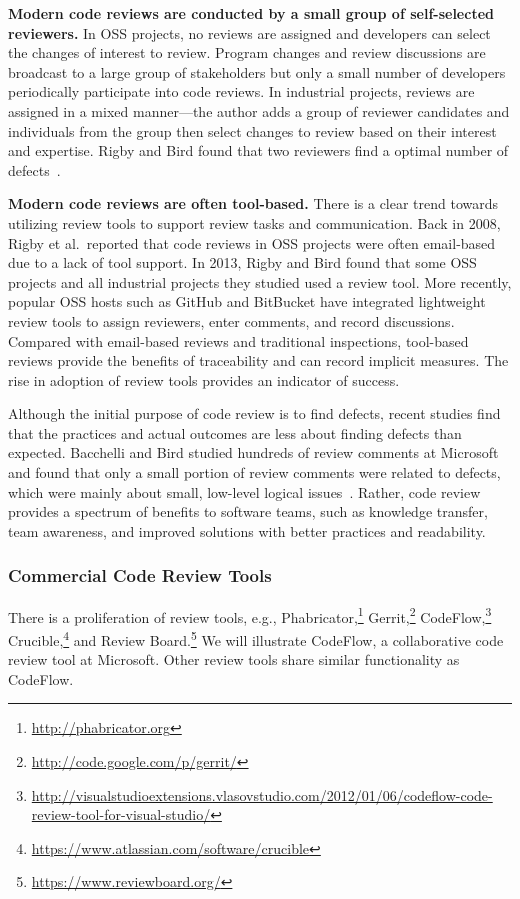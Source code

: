 \documentclass[runningheads,a4paper]{llncs}
\begin{document}
{\bf Modern code reviews are conducted by a small group of self-selected reviewers.} 
In OSS projects, no reviews are assigned and developers can select the changes of interest to review. Program changes and review discussions are broadcast to a large group of stakeholders but only a small number of developers periodically participate into code reviews. In industrial projects, reviews are assigned in a mixed manner---the author adds a group of reviewer candidates and individuals from the group then select changes to review based on their interest and expertise. Rigby and Bird found that two reviewers find a optimal number of defects~\cite{rigby2013convergent}.

{\bf Modern code reviews are often tool-based.} There is a clear trend towards utilizing review tools to support review tasks and communication. Back in 2008, Rigby et al.~reported that code reviews in OSS projects were often email-based due to a lack of tool support. In 2013, Rigby and Bird found that some OSS projects and all industrial projects they studied used a review tool. More recently, popular OSS hosts such as GitHub and BitBucket have integrated lightweight review tools to assign reviewers, enter comments, and record discussions. Compared with email-based reviews and traditional inspections, tool-based reviews provide the benefits of traceability and can record implicit measures. The rise in adoption of review tools provides an indicator of success.

Although the initial purpose of code review is to find defects, recent studies find that the practices and actual outcomes are less about finding defects than expected. Bacchelli and Bird studied hundreds of review comments at Microsoft and found that only a small portion of review comments were related to defects, which were mainly about small, low-level logical issues~\cite{bacchelli2013expectations}. Rather, code review provides a spectrum of benefits to software teams, such as knowledge transfer, team awareness, and improved solutions with better practices and readability. 

\subsubsection{Commercial Code Review Tools} 

There is a proliferation of review tools, e.g., Phabricator,\footnote{\url{http://phabricator.org}} Gerrit,\footnote{\url{http://code.google.com/p/gerrit/}} CodeFlow,\footnote{\url{http://visualstudioextensions.vlasovstudio.com/2012/01/06/codeflow-code-review-tool-for-visual-studio/}} Crucible,\footnote{\url{https://www.atlassian.com/software/crucible}} and Review Board.\footnote{\url{https://www.reviewboard.org/}} We will illustrate CodeFlow, a collaborative code review tool at Microsoft. Other review tools share similar functionality as CodeFlow.
\end{document}
